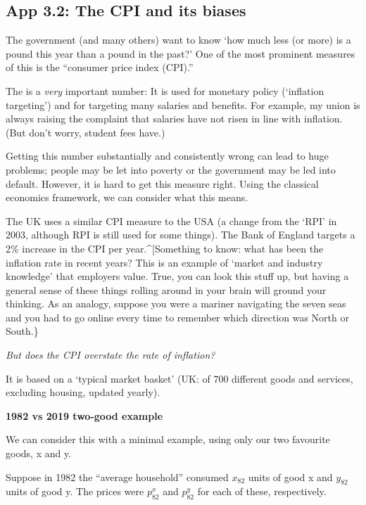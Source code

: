 \documentclass[]{article}
\begin{document}
\bigskip

\hypertarget{app-3.2-the-cpi-and-its-biases}{%
\subsection{App 3.2: The CPI and its
biases}\label{app-3.2-the-cpi-and-its-biases}}

The government (and many others) want to know `how much less (or more)
is a pound this year than a pound in the past?' One of the most
prominent measures of this is the ``consumer price index (CPI).''

The is a \emph{very} important number: It is used for monetary policy
(`inflation targeting') and for targeting many salaries and benefits.
For example, my union is always raising the complaint that salaries have
not risen in line with inflation. (But don't worry, student fees have.)

Getting this number substantially and consistently wrong can lead to
huge problems; people may be let into poverty or the government may be
led into default. However, it is hard to get this measure right. Using
the classical economics framework, we can consider what this means.

The UK uses a similar CPI measure to the USA (a change from the `RPI' in
2003, although RPI is still used for some things). The Bank of England
targets a 2\% increase in the CPI per year.\^{}{[}Something to know:
what has been the inflation rate in recent years? This is an example of
`market and industry knowledge' that employers value. True, you can look
this stuff up, but having a general sense of these things rolling around
in your brain will ground your thinking. As an analogy, suppose you were
a mariner navigating the seven seas and you had to go online every time
to remember which direction was North or South.\}

\emph{But does the CPI overstate the rate of inflation?}

It is based on a `typical market basket' (UK: of 700 different goods and
services, excluding housing, updated yearly).

\textbf{1982 vs 2019 two-good example}

We can consider this with a minimal example, using only our two
favourite goods, x and y.

Suppose in 1982 the ``average household'' consumed \(x_{82}\) units of
good x and \(y_{82}\) units of good y. The prices were \(p^x_{82}\) and
\(p^y_{82}\) for each of these, respectively.
\end{document}
